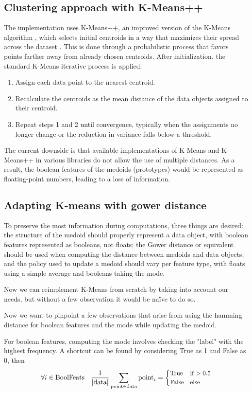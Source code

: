\documentclass[9pt,twocolumn]{article}
\begin{document}
\subsection{Clustering approach with K-Means++}
The implementation uses K-Means++, an improved version of the K-Means algorithm \cite{hartigan1979algorithm}, which selects initial centroids in a way that maximizes their spread across the dataset \cite{arthur2007k}. This is done through a probabilistic process that favors points farther away from already chosen centroids. After initialization, the standard K-Means iterative process is applied:
\begin{enumerate}
    \item Assign each data point to the nearest centroid.
    \item Recalculate the centroids as the mean distance of the data objects assigned to their centroid.
    \item Repeat steps 1 and 2 until convergence, typically when the assignments no longer change or the reduction in variance falls below a threshold.
\end{enumerate}

The current downside is that available implementations of K-Means and K-Means++ in various libraries do not allow the use of multiple distances. As a result, the boolean features of the medoids (prototypes) would be represented as floating-point numbers, leading to a loss of information.

\subsection{Adapting K-means with gower distance}
To preserve the most information during computations, three things are desired: the structure of the medoid should properly represent a data object, with boolean features represented as booleans, not floats; the Gower distance or equivalent should be used when computing the distance between medoids and data objects; and the policy used to update a medoid should vary per feature type, with floats using a simple average and booleans taking the mode.

Now we can reimplement K-Means from scratch by taking into account our needs, but without a few observation it would be naïve to do so.

Now we want to pinpoint a few observations that arise from using the hamming distance for boolean features and the mode while updating the medoid.

For boolean features, computing the mode involves checking the "label" with the highest frequency. A shortcut can be found by considering True as 1 and False as 0, then
\begin{equation*}
\small
    \forall i \in \mathrm{BoolFeats} \quad \frac{1}{\vert \mathrm{data} \vert}\sum_{\mathrm{point}\in\mathrm{data}} \mathrm{point}_i = \begin{cases} \mathrm{True} & \mathrm{if }> 0.5\\ \mathrm{False}&\mathrm{else}\end{cases}
\end{equation*}
\end{document}
